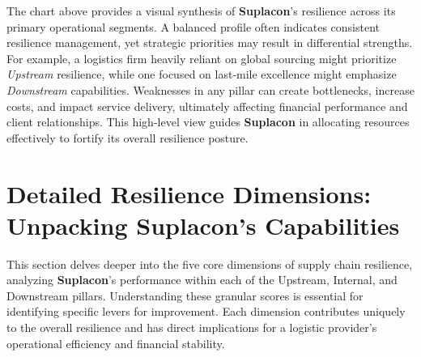 \documentclass[
  oneside,
  open=any,
  fontsize=11pt]{scrbook}
\begin{document}
The chart above provides a visual synthesis of \textbf{Suplacon}'s
resilience across its primary operational segments. A balanced profile
often indicates consistent resilience management, yet strategic
priorities may result in differential strengths. For example, a
logistics firm heavily reliant on global sourcing might prioritize
\emph{Upstream} resilience, while one focused on last-mile excellence
might emphasize \emph{Downstream} capabilities. Weaknesses in any pillar
can create bottlenecks, increase costs, and impact service delivery,
ultimately affecting financial performance and client relationships.
This high-level view guides \textbf{Suplacon} in allocating resources
effectively to fortify its overall resilience posture.

\chapter{Detailed Resilience Dimensions: Unpacking Suplacon's
Capabilities}\label{detailed-resilience-dimensions-unpacking-suplacons-capabilities}

This section delves deeper into the five core dimensions of supply chain
resilience, analyzing \textbf{Suplacon}'s performance within each of the
Upstream, Internal, and Downstream pillars. Understanding these granular
scores is essential for identifying specific levers for improvement.
Each dimension contributes uniquely to the overall resilience and has
direct implications for a logistic provider's operational efficiency and
financial stability.
\end{document}
